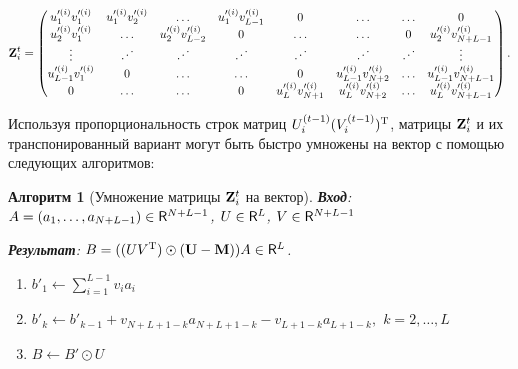 \documentclass[12pt, specialist, subf,href,colorlinks=true,substylefile = spbu.rtx]{disser}
\newtheorem{algorithm}{Алгоритм}
\theoremstyle{remark}
\theoremstyle{definition}
\begin{document}
\begin{equation*}
\mathbf{Z}^{t}_i = \begin{pmatrix}
u'^{(i)}_1 v'^{(i)}_1 & u'^{(i)}_1 v'^{(i)}_2 & \ldots & u'^{(i)}_1 v'^{(i)}_{L-1} & 0 & \ldots & \ldots & 0\\
u'^{(i)}_2 v'^{(i)}_1 & \ldots  &u'^{(i)}_2 v'^{(i)}_{L-2} & 0 & \ldots & \ldots & 0 & u'^{(i)}_2 v'^{(i)}_{N + L - 1} \\ 
\vdots & \iddots & \iddots & \iddots & \iddots & \iddots & \iddots & \vdots \\ 
u'^{(i)}_{L-1} v'^{(i)}_1 & 0 & \ldots & \ldots & 0 & u'^{(i)}_{L-1} v'^{(i)}_{N + 2} & \ldots & u'^{(i)}_{L-1} v'^{(i)}_{N + L - 1} \\
0 & \ldots & \ldots & 0 & u'^{(i)}_L v'^{(i)}_{N + 1} & u'^{(i)}_L v'^{(i)}_{N + 2} & \ldots & u'^{(i)}_L v'^{(i)}_{N + L - 1} \\
\end{pmatrix}.
\end{equation*}

Используя пропорциональность строк матриц $U_i^{(t-1)} (V_i^{(t-1)})^{\mathrm{T}}$, матрицы $\mathbf{Z}^{t}_i$ и их транспонированный вариант могут быть быстро умножены на вектор с помощью следующих алгоритмов:
\begin{algorithm}[Умножение матрицы $\mathbf{Z}^{t}_i$ на вектор]
	\textbf{Вход}: $A = (a_1, \ldots, a_{N + L - 1}) \in \mathsf{R}^{N + L - 1}$, $U \in \mathsf{R}^L$, $V \in \mathsf{R}^{N + L - 1}$
	
	\textbf{Результат}:
	$B = ((U V^{\mathrm{T}}) \odot (\mathbf{U}-\mathbf{M})) A \in \mathsf{R}^L$.
	
	\begin{enumerate}
		\item
		$b'_1 \leftarrow \sum\limits_{i=1}^{L-1}v_i a_i$
		\item
		$b'_k \leftarrow b'_{k-1} + v_{N + L + 1 - k}a_{N + L + 1 - k} - v_{L + 1 - k}a_{L + 1 - k},$ $k = 2, \ldots, L$
		\item
		$B \leftarrow B' \odot U$
	\end{enumerate}
\end{algorithm}
\end{document}
